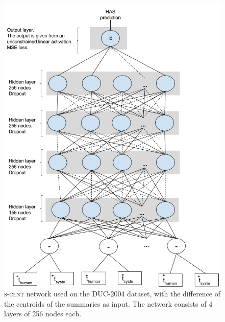 \documentclass[11pt,a4paper]{article}
\newcommand{\duc}{\textsc{DUC-2004}\xspace}
\begin{document}
\begin{figure}[ht]
{
\centering
\includegraphics[scale=0.35]{../../my_diagrams/DUC_dataset/DUC_s-cent.png}
\caption{\textsc{s-cent} network used on the \duc dataset, with the difference of the centroids of the summaries as input. The network consists of 4 layers of 256 nodes each.}
\label{fig:duc-s-cent}
}
\end{figure}
\end{document}
